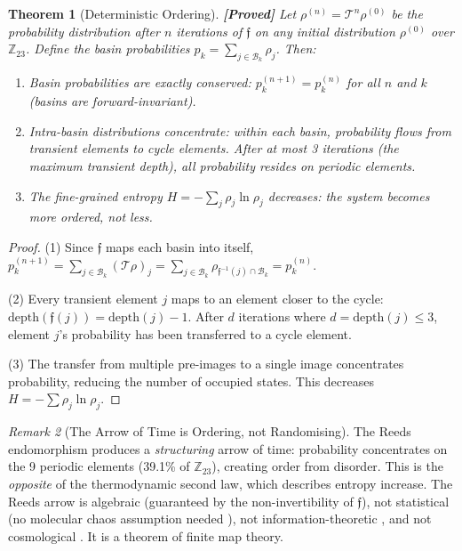 \documentclass[12pt,a4paper]{article}
\newcommand{\proved}[1]{\textcolor{proved}{\textbf{[Proved]}} #1}
\newtheorem{theorem}{Theorem}[section]
\theoremstyle{definition}
\theoremstyle{remark}
\newtheorem{remark}[theorem]{Remark}
\newcommand{\Reeds}{\mathfrak{f}}
\newcommand{\Zp}{\mathbb{Z}_{23}}
\newcommand{\Basin}{\mathcal{B}}
\begin{document}
\begin{theorem}[Deterministic Ordering]
\label{thm:ordering}
\proved{Let $\rho^{(n)} = \mathcal{T}^n \rho^{(0)}$ be the probability
distribution after $n$ iterations of $\Reeds$ on any initial distribution
$\rho^{(0)}$ over $\Zp$. Define the basin probabilities $p_k = \sum_{j \in
\Basin_k} \rho_j$. Then:}
\begin{enumerate}
  \item Basin probabilities are \emph{exactly conserved}: $p_k^{(n+1)} = p_k^{(n)}$
  for all $n$ and $k$ (basins are forward-invariant).
  \item Intra-basin distributions \emph{concentrate}: within each basin, probability
  flows from transient elements to cycle elements. After at most 3 iterations
  (the maximum transient depth), all probability resides on periodic elements.
  \item The fine-grained entropy $H = -\sum_j \rho_j \ln \rho_j$ \emph{decreases}:
  the system becomes more ordered, not less.
\end{enumerate}
\end{theorem}

\begin{proof}
(1) Since $\Reeds$ maps each basin into itself, $p_k^{(n+1)} = \sum_{j \in
\Basin_k} (\mathcal{T}\rho)_j = \sum_{j \in \Basin_k} \rho_{\Reeds^{-1}(j)
\cap \Basin_k} = p_k^{(n)}$.

(2) Every transient element $j$ maps to an element closer to the cycle:
$\text{depth}(\Reeds(j)) = \text{depth}(j) - 1$. After $d$ iterations where
$d = \text{depth}(j) \leq 3$, element $j$'s probability has been transferred
to a cycle element.

(3) The transfer from multiple pre-images to a single image concentrates
probability, reducing the number of occupied states. This decreases
$H = -\sum \rho_j \ln \rho_j$.
\end{proof}

\begin{remark}[The Arrow of Time is Ordering, not Randomising]
The Reeds endomorphism produces a \emph{structuring} arrow of time: probability
concentrates on the 9 periodic elements (39.1\% of $\Zp$), creating order
from disorder. This is the \emph{opposite} of the thermodynamic second law,
which describes entropy increase. The Reeds arrow is algebraic (guaranteed by
the non-invertibility of $\Reeds$), not statistical (no molecular chaos
assumption needed \cite{boltzmann1872}), not information-theoretic
\cite{jaynes1957}, and not cosmological \cite{penrose1979}. It is a theorem
of finite map theory.
\end{remark}
\end{document}
